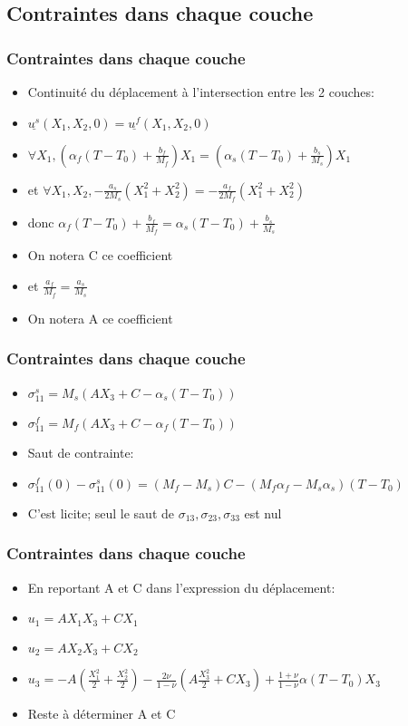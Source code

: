 \subsection{Contraintes dans chaque couche} 
\begin{frame}
    \frametitle{Contraintes dans chaque couche} 
    \begin{itemize}
        \item Continuité du déplacement à l'intersection entre les 2 couches:
        \item $\underline{u^s}(X_1,X_2,0)=\underline{u^f}(X_1,X_2,0)$
        \item $\forall X_1,(\alpha_f(T-T_0)+\frac{b_f}{M_f})X_1 = (\alpha_s(T-T_0)+\frac{b_s}{M_s})X_1$
        \item et $\forall X_1,X_2, -\frac{a_s}{2M_s}(X_1^2+X_2^2)=-\frac{a_f}{2M_f}(X_1^2+X_2^2)$
        \item donc $\alpha_f(T-T_0)+\frac{b_f}{M_f}=\alpha_s(T-T_0)+\frac{b_s}{M_s}$
        \item On notera C ce coefficient
        \item et $\frac{a_f}{M_f}=\frac{a_s}{M_s}$
        \item On notera A ce coefficient
    \end{itemize}
\end{frame}

\begin{frame}
    \frametitle{Contraintes dans chaque couche} 
    \begin{itemize}
        \item $\sigma_{11}^s=M_s(AX_3+C-\alpha_s(T-T_0))$
        \item $\sigma_{11}^f=M_f(AX_3+C-\alpha_f(T-T_0))$
        \item Saut de contrainte:
        \item $\sigma_{11}^f(0)-\sigma_{11}^s(0) = (M_f-M_s)C-(M_f\alpha_f-M_s\alpha_s)(T-T_0)$
        \item C'est licite; seul le saut de $\sigma_{13},\sigma_{23},\sigma_{33}$ est nul
    \end{itemize}
\end{frame} 

\begin{frame}
    \frametitle{Contraintes dans chaque couche} 
    \begin{itemize}
        \item En reportant A et C dans l'expression du déplacement:
        \item $u_1=AX_1X_3+CX_1$
        \item $u_2=AX_2X_3+CX_2$
        \item $u_3= -A(\frac{X_1^2}{2}+\frac{X_2^2}{2})-\frac{2\nu}{1-\nu}(A\frac{X_3^2}{2}+CX_3)+\frac{1+\nu}{1-\nu}\alpha(T-T_0)X_3$
        \item Reste à déterminer A et C
    \end{itemize}
\end{frame} 

